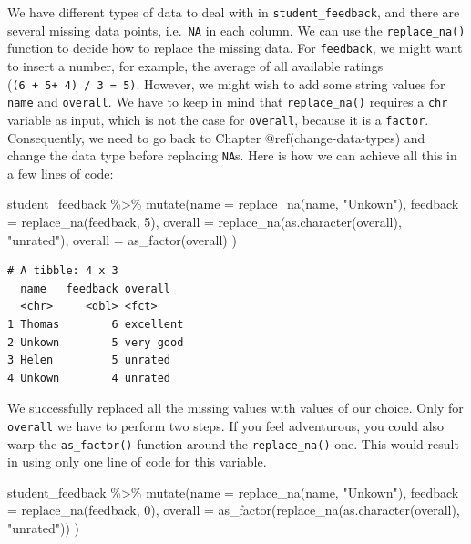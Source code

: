 \documentclass[
  letterpaper,
]{krantz}
\makeatletter
\newenvironment{Shaded}{\begin{snugshade}}{\end{snugshade}}
\newcommand{\AttributeTok}[1]{\textcolor[rgb]{0.40,0.45,0.13}{#1}}
\newcommand{\DecValTok}[1]{\textcolor[rgb]{0.68,0.00,0.00}{#1}}
\newcommand{\FunctionTok}[1]{\textcolor[rgb]{0.28,0.35,0.67}{#1}}
\newcommand{\NormalTok}[1]{\textcolor[rgb]{0.00,0.23,0.31}{#1}}
\newcommand{\SpecialCharTok}[1]{\textcolor[rgb]{0.37,0.37,0.37}{#1}}
\newcommand{\StringTok}[1]{\textcolor[rgb]{0.13,0.47,0.30}{#1}}
\newenvironment{kframe}{%
\medskip{}
\setlength{\fboxsep}{.8em}
 \def\at@end@of@kframe{}%
 \ifinner\ifhmode%
  \def\at@end@of@kframe{\end{minipage}}%
  \begin{minipage}{\columnwidth}%
 \fi\fi%
 \def\FrameCommand##1{\hskip\@totalleftmargin \hskip-\fboxsep
 \colorbox{shadecolor}{##1}\hskip-\fboxsep
     \hskip-\linewidth \hskip-\@totalleftmargin \hskip\columnwidth}%
 \MakeFramed {\advance\hsize-\width
   \@totalleftmargin\z@ \linewidth\hsize
   \@setminipage}}%
 {\par\unskip\endMakeFramed%
 \at@end@of@kframe}
\renewenvironment{Shaded}{\begin{kframe}}{\end{kframe}}
\makeatother
\begin{document}
We have different types of data to deal with in
\texttt{student\_feedback}, and there are several missing data points,
i.e.~\texttt{NA} in each column. We can use the \texttt{replace\_na()}
function to decide how to replace the missing data. For
\texttt{feedback}, we might want to insert a number, for example, the
average of all available ratings (\texttt{(6\ +\ 5+\ 4)\ /\ 3\ =\ 5)}.
However, we might wish to add some string values for \texttt{name} and
\texttt{overall}. We have to keep in mind that \texttt{replace\_na()}
requires a \texttt{chr} variable as input, which is not the case for
\texttt{overall}, because it is a \texttt{factor}. Consequently, we need
to go back to Chapter @ref(change-data-types) and change the data type
before replacing \texttt{NA}s. Here is how we can achieve all this in a
few lines of code:

\begin{Shaded}
\begin{Highlighting}[]
\NormalTok{student\_feedback }\SpecialCharTok{\%\textgreater{}\%}
  \FunctionTok{mutate}\NormalTok{(}\AttributeTok{name =} \FunctionTok{replace\_na}\NormalTok{(name, }\StringTok{"Unkown"}\NormalTok{),}
         \AttributeTok{feedback =} \FunctionTok{replace\_na}\NormalTok{(feedback, }\DecValTok{5}\NormalTok{),}
         \AttributeTok{overall =} \FunctionTok{replace\_na}\NormalTok{(}\FunctionTok{as.character}\NormalTok{(overall), }\StringTok{"unrated"}\NormalTok{),}
         \AttributeTok{overall =} \FunctionTok{as\_factor}\NormalTok{(overall)}
\NormalTok{         )}
\end{Highlighting}
\end{Shaded}

\begin{verbatim}
# A tibble: 4 x 3
  name   feedback overall  
  <chr>     <dbl> <fct>    
1 Thomas        6 excellent
2 Unkown        5 very good
3 Helen         5 unrated  
4 Unkown        4 unrated  
\end{verbatim}

We successfully replaced all the missing values with values of our
choice. Only for \texttt{overall} we have to perform two steps. If you
feel adventurous, you could also warp the \texttt{as\_factor()} function
around the \texttt{replace\_na()} one. This would result in using only
one line of code for this variable.

\begin{Shaded}
\begin{Highlighting}[]
\NormalTok{student\_feedback }\SpecialCharTok{\%\textgreater{}\%}
  \FunctionTok{mutate}\NormalTok{(}\AttributeTok{name =} \FunctionTok{replace\_na}\NormalTok{(name, }\StringTok{"Unkown"}\NormalTok{),}
         \AttributeTok{feedback =} \FunctionTok{replace\_na}\NormalTok{(feedback, }\DecValTok{0}\NormalTok{),}
         \AttributeTok{overall =} \FunctionTok{as\_factor}\NormalTok{(}\FunctionTok{replace\_na}\NormalTok{(}\FunctionTok{as.character}\NormalTok{(overall), }\StringTok{"unrated"}\NormalTok{))}
\NormalTok{         )}
\end{Highlighting}
\end{Shaded}
\end{document}
